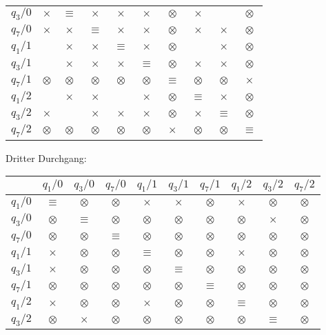 \begin{loesung}
\begin{teilaufgaben}
\begin{center}
\begin{tabular}{|c|ccccccccc|}
$q_3/0$  &$\times$ &$\equiv$ &$\times$ &$\times$ &$\times$ &$\otimes$&$\times$ &         &$\otimes$\\
$q_7/0$  &$\times$ &$\times$ &$\equiv$ &$\times$ &$\times$ &$\otimes$&$\times$ &$\times$ &$\otimes$\\
$q_1/1$  &         &$\times$ &$\times$ &$\equiv$ &$\times$ &$\otimes$&         &$\times$ &$\otimes$\\
$q_3/1$  &         &$\times$ &$\times$ &$\times$ &$\equiv$ &$\otimes$&$\times$ &$\times$ &$\otimes$\\
$q_7/1$  &$\otimes$&$\otimes$&$\otimes$&$\otimes$&$\otimes$&$\equiv$ &$\otimes$&$\otimes$&$\times$ \\
$q_1/2$  &         &$\times$ &$\times$ &         & $\times$&$\otimes$&$\equiv$& $\times$&$\otimes$\\
$q_3/2$  &$\times$ &         &$\times$ &$\times$ &$\times$ &$\otimes$&$\times$ &$\equiv$ &$\otimes$\\
$q_7/2$  &$\otimes$&$\otimes$&$\otimes$&$\otimes$&$\otimes$&$\times$ &$\otimes$&$\otimes$&$\equiv$ \\
\hline
\end{tabular}
\end{center}
Dritter Durchgang:
\begin{center}
\begin{tabular}{|c|ccccccccc|}
\hline
         &$q_1/0$  &$q_3/0$  &$q_7/0$  &$q_1/1$  &$q_3/1$  &$q_7/1$  &$q_1/2$  &$q_3/2$  &$q_7/2$  \\
\hline
$q_1/0$  &$\equiv$ &$\otimes$&$\otimes$&$\times$ &$\times$ &$\otimes$&$\times$ &$\otimes$&$\otimes$\\
$q_3/0$  &$\otimes$&$\equiv$ &$\otimes$&$\otimes$&$\otimes$&$\otimes$&$\otimes$&$\times$ &$\otimes$\\
$q_7/0$  &$\otimes$&$\otimes$&$\equiv$ &$\otimes$&$\otimes$&$\otimes$&$\otimes$&$\otimes$&$\otimes$\\
$q_1/1$  &$\times$ &$\otimes$&$\otimes$&$\equiv$ &$\otimes$&$\otimes$&$\times$ &$\otimes$&$\otimes$\\
$q_3/1$  &$\times$ &$\otimes$&$\otimes$&$\otimes$&$\equiv$ &$\otimes$&$\otimes$&$\otimes$&$\otimes$\\
$q_7/1$  &$\otimes$&$\otimes$&$\otimes$&$\otimes$&$\otimes$&$\equiv$ &$\otimes$&$\otimes$&$\otimes$\\
$q_1/2$  &$\times$ &$\otimes$&$\otimes$&$\times$ &$\otimes$&$\otimes$&$\equiv$ &$\otimes$&$\otimes$\\
$q_3/2$  &$\otimes$&$\times$ &$\otimes$&$\otimes$&$\otimes$&$\otimes$&$\otimes$&$\equiv$ &$\otimes$\\

\end{tabular}
\end{center}
\end{teilaufgaben}
\end{loesung}
